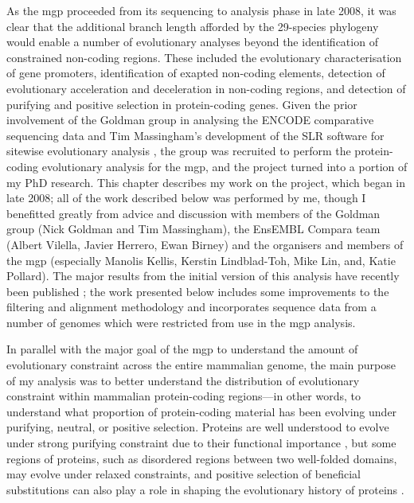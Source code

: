 As the \ac{mgp} proceeded from its sequencing to analysis phase in late
2008, it was clear that the additional branch length afforded by the
29-species phylogeny would enable a number of evolutionary analyses
beyond the identification of constrained non-coding regions. These
included the evolutionary characterisation of gene promoters,
identification of exapted non-coding elements, detection of
evolutionary acceleration and deceleration in non-coding regions, and
detection of purifying and positive selection in protein-coding
genes. Given the prior involvement of the Goldman group in analysing
the ENCODE comparative sequencing data
\citep{Margulies2007,ENCODE_Project_Consortium2007a} and Tim
Massingham's development of the SLR software for sitewise evolutionary
analysis \citep{Massingham2005}, the group was recruited to perform
the protein-coding evolutionary analysis for the \ac{mgp}, and the project
turned into a portion of my PhD research. This chapter describes my
work on the project, which began in late 2008; all of the work
described below was performed by me, though I benefitted greatly from
advice and discussion with members of the Goldman group (Nick Goldman
and Tim Massingham), the EnsEMBL Compara team (Albert Vilella, Javier
Herrero, Ewan Birney) and the organisers and members of the \ac{mgp}
(especially Manolis Kellis, Kerstin Lindblad-Toh, Mike Lin, and, Katie
Pollard). The major results from the initial version of this analysis
have recently been published \citep{LindbladToh2011}; the work
presented below includes some improvements to the filtering and
alignment methodology and incorporates sequence data from a number of
genomes which were restricted from use in the \ac{mgp} analysis.

In parallel with the major goal of the \ac{mgp} to understand the
amount of evolutionary constraint across the entire mammalian genome,
the main purpose of my analysis was to better understand the
distribution of evolutionary constraint within mammalian
protein-coding regions---in other words, to understand what proportion
of protein-coding material has been evolving under purifying, neutral,
or positive selection. Proteins are well understood to evolve under
strong purifying constraint due to their functional importance
\citep{Fay2003}, but some regions of proteins, such as disordered
regions between two well-folded domains, may evolve under relaxed
constraints, and positive selection of beneficial substitutions can
also play a role in shaping the evolutionary history of proteins
\citep{Pal2006}.

